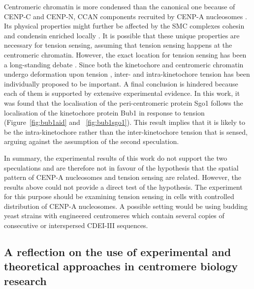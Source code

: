 Centromeric chromatin is more condensed than the canonical one because of CENP-C and CENP-N, CCAN components recruited by CENP-A nucleosomes \citep{Geiss2014, Panchenko2011, Zhou2022}. Its physical properties might further be affected by the SMC complexes cohesin and condensin enriched locally \citep{Verzijlbergen2014, Haase2012Bub1Dynamics, Paldi2020ConvergentPericentromeres}. It is possible that these unique properties are necessary for tension sensing, assuming that tension sensing happens at the centromeric chromatin. However, the exact location for tension sensing has been a long-standing  debate \citep{McVey2021AuroraSegregation}. Since both the kinetochore and centromeric chromatin undergo deformation upon tension \citep{Goshima2000EstablishingYeast, Roscioli2020}, inter- and intra-kinetochore tension has been individually proposed to be important. A final conclusion is hindered because each of them is supported by extensive experimental evidence. In this work, it was found that the localisation of the peri-centromeric protein Sgo1 follows the localisation of the kinetochore protein Bub1 in response to tension (Figure~\ref{fig:bub1aid} and ~\ref{fig:bub1sgo1}). This result implies that it is likely to be the intra-kinetochore rather than the inter-kinetochore tension that is sensed, arguing against the assumption of the second speculation. 

In summary, the experimental results of this work do not support the two speculations and are therefore not in favour of the hypothesis that the spatial pattern of CENP-A nucleosomes and tension sensing are related. However, the results above could not provide a direct test of the hypothesis. The experiment for this purpose should be examining tension sensing in cells with controlled distribution of CENP-A nucleosomes. A possible setting would be using budding yeast strains with engineered centromeres which contain several copies of consecutive or interspersed CDEI-III sequences. 

\subsection{A reflection on the use of experimental and theoretical approaches in centromere biology research}

